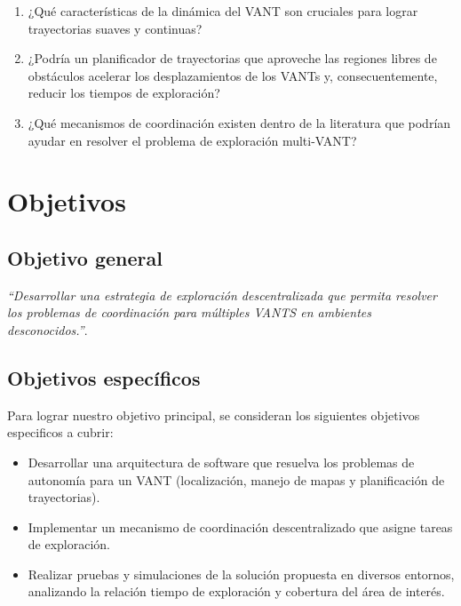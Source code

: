 \begin{enumerate}\setlength{\itemsep}{-1mm}
\item ¿Qué características de la dinámica del VANT son cruciales para lograr trayectorias suaves y continuas?
\item ¿Podría un planificador de trayectorias que aproveche las regiones libres de obstáculos acelerar los desplazamientos de los VANTs y, consecuentemente, reducir los tiempos de exploración?
\item ¿Qué mecanismos de coordinación existen dentro de la literatura que podrían ayudar en resolver el problema de exploración multi-VANT?
\end{enumerate}

\section{Objetivos}

\subsection*{Objetivo general}

\emph{``Desarrollar una estrategia de exploración descentralizada que permita resolver los problemas de coordinación para múltiples VANTS en ambientes desconocidos.''}.

\subsection*{Objetivos específicos}

Para lograr nuestro objetivo principal, se consideran los siguientes objetivos especificos a cubrir:

\begin{itemize}\setlength{\itemsep}{-1mm}
\item Desarrollar una arquitectura de software que resuelva los problemas de autonomía para un VANT (localización, manejo de mapas y planificación de trayectorias).
\item Implementar un mecanismo de coordinación descentralizado que asigne tareas de exploración.
\item Realizar pruebas y simulaciones de la solución propuesta en diversos entornos, analizando la relación tiempo de exploración y cobertura del área de interés.
\end{itemize}

\newpage

